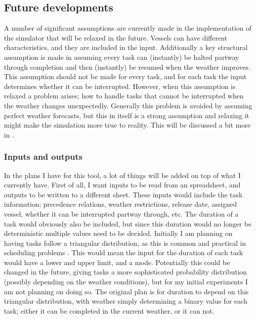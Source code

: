 \documentclass[a4paper,12pt]{article}
\begin{document}
\subsection{Future developments} \label{ss:simfut}
A number of significant assumptions are currently made in the implementation of the simulator that will be relaxed in the future. Vessels can have different characteristics, and they are included in the input. Additionally a key structural assumption is made in assuming every task can (instantly) be halted partway through completion and then (instantly) be resumed when the weather improves. This assumption should not be made for every task, and for each task the input determines whether it can be interrupted. However, when this assumption is relaxed a problem arises; how to handle tasks that cannot be interrupted when the weather changes unexpectedly. Generally this problem is avoided by assuming perfect weather forecasts, but this in itself is a strong assumption and relaxing it might make the simulation more true to reality. This will be discussed a bit more in . 

\subsubsection{Inputs and outputs} \label{sss:inou}
In the plans I have for this tool, a lot of things will be added on top of what I currently have. First of all, I want inputs to be read from an spreadsheet, and outputs to be written to a different sheet. These inputs would include the task information; precedence relations, weather restrictions, release date, assigned vessel, whether it can be interrupted partway through, etc.  The duration of a task would obviously also be included, but since this duration would no longer be deterministic multiple values need to be decided. Initially I am planning on having tasks follow a triangular distribution, as this is common and practical in scheduling problems \cite{williams1992practical}. This would mean the input for the duration of each task would have a lower and upper limit, and a mode. Potentially this could be changed in the future, giving tasks a more sophisticated probability distribution (possibly depending on the weather conditions), but for my initial experiments I am not planning on doing so. The original plan is for duration to depend on this triangular distribution, with weather simply determining a binary value for each task; either it can be completed in the current weather, or it can not. 
\end{document}
